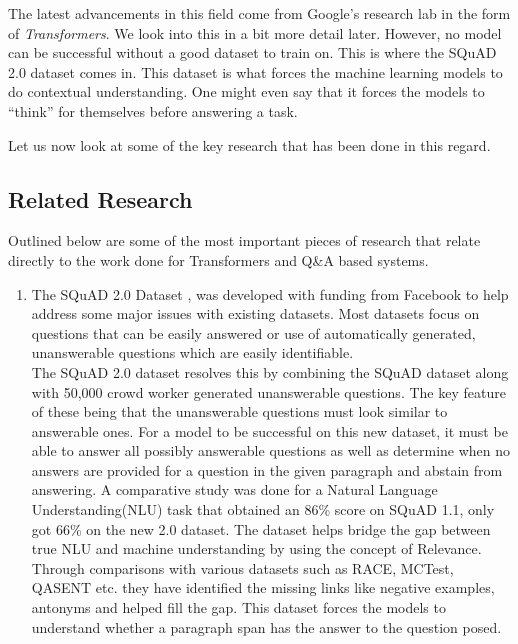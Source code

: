 \documentclass[12pt]{report}
\begin{document}
\begin{appendices}
        The latest advancements in this field come from Google's research lab in the form of \textit{Transformers}. We look into this in a bit more detail later. However, no model can be successful without a good dataset to train on. This is where the SQuAD 2.0 dataset \citep{dataset} comes in. This dataset is what forces the machine learning models to do contextual understanding. One might even say that it forces the models to ``think'' for themselves before answering a task.

        Let us now look at some of the key research that has been done in this regard.

        \subsection{Related Research}\label{rr}
        Outlined below are some of the most important pieces of research that relate directly to the work done for Transformers and Q\&A based systems.
        \begin{enumerate}
            \item The SQuAD 2.0 Dataset \citep{dataset}, was developed with funding from Facebook to help address some major issues with existing datasets. Most datasets focus on questions that can be easily answered or use of automatically generated, unanswerable questions which are easily identifiable.\\
            The SQuAD 2.0 dataset resolves this by combining the SQuAD dataset along with 50,000 crowd worker generated unanswerable questions. The key feature of these being that the unanswerable questions must look similar to answerable ones. For a model to be successful on this new dataset, it must be able to answer all possibly answerable questions as well as determine when no answers are provided for a question in the given paragraph and abstain from answering. A comparative study was done for a Natural Language Understanding(NLU) task that obtained an 86\% score on SQuAD 1.1, only got 66\% on the new 2.0 dataset.
            The dataset helps bridge the gap between true NLU and machine understanding by using the concept of Relevance. Through comparisons with various datasets such as RACE, MCTest, QASENT etc. they have identified the missing links like negative examples, antonyms and helped fill the gap. This dataset forces the models to understand whether a paragraph span has the answer to the question posed.


\end{enumerate}
\end{appendices}
\end{document}
